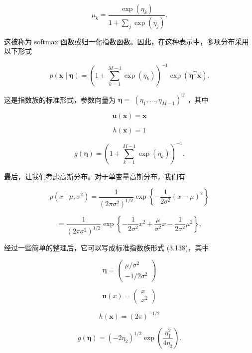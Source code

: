 \documentclass[10pt]{report}
\begin{document}
\[
{\mu }_{k} = \frac{\exp \left( {\eta }_{k}\right) }{1 + \mathop{\sum }\limits_{j}\exp \left( {\eta }_{j}\right) }. \tag{3.157}
\]

这被称为 softmax 函数或归一化指数函数。因此，在这种表示中，多项分布采用以下形式

\[
p\left( {\mathbf{x} \mid  \mathbf{\eta }}\right)  = {\left( 1 + \mathop{\sum }\limits_{{k = 1}}^{{M - 1}}\exp \left( {\eta }_{k}\right) \right) }^{-1}\exp \left( {{\mathbf{\eta }}^{\mathrm{T}}\mathbf{x}}\right) . \tag{3.158}
\]

这是指数族的标准形式，参数向量为 \(\mathbf{\eta } =\)  \({\left( {\eta }_{1},\ldots ,{\eta }_{M - 1}\right) }^{\mathrm{T}}\) ，其中

\[
\mathbf{u}\left( \mathbf{x}\right)  = \mathbf{x} \tag{3.159}
\]

\[
h\left( \mathbf{x}\right)  = 1 \tag{3.160}
\]

\[
g\left( \mathbf{\eta }\right)  = {\left( 1 + \mathop{\sum }\limits_{{k = 1}}^{{M - 1}}\exp \left( {\eta }_{k}\right) \right) }^{-1}. \tag{3.161}
\]

最后，让我们考虑高斯分布。对于单变量高斯分布，我们有

\[
p\left( {x \mid  \mu ,{\sigma }^{2}}\right)  = \frac{1}{{\left( 2\pi {\sigma }^{2}\right) }^{1/2}}\exp \left\{  {-\frac{1}{2{\sigma }^{2}}{\left( x - \mu \right) }^{2}}\right\}   \tag{3.162}
\]

\[
= \frac{1}{{\left( 2\pi {\sigma }^{2}\right) }^{1/2}}\exp \left\{  {-\frac{1}{2{\sigma }^{2}}{x}^{2} + \frac{\mu }{{\sigma }^{2}}x - \frac{1}{2{\sigma }^{2}}{\mu }^{2}}\right\}  , \tag{3.163}
\]

经过一些简单的整理后，它可以写成标准指数族形式 (3.138)，其中

\[
\mathbf{\eta } = \left( \begin{matrix} \mu /{\sigma }^{2} \\   - 1/2{\sigma }^{2} \end{matrix}\right)  \tag{3.164}
\]

\[
\mathbf{u}\left( x\right)  = \left( \begin{matrix} x \\  {x}^{2} \end{matrix}\right)  \tag{3.165}
\]

\[
h\left( \mathbf{x}\right)  = {\left( 2\pi \right) }^{-1/2} \tag{3.166}
\]

\[
g\left( \mathbf{\eta }\right)  = {\left( -2{\eta }_{2}\right) }^{1/2}\exp \left( \frac{{\eta }_{1}^{2}}{4{\eta }_{2}}\right) . \tag{3.167}
\]
\end{document}
